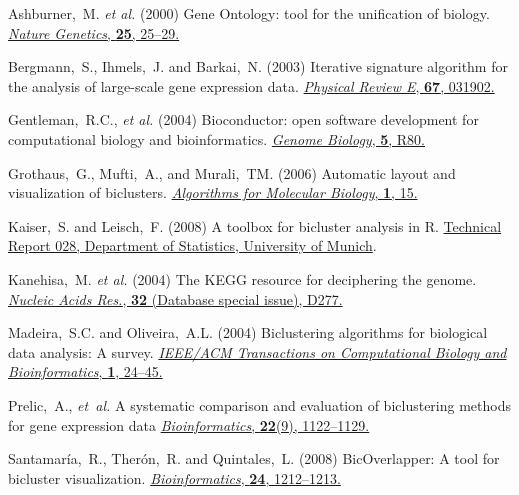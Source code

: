 \documentclass[round]{bioinfo}
\begin{document}
\begin{thebibliography}{6}

Ashburner,~M. \emph{et al.} (2000)
Gene Ontology: tool for the unification of biology.
\href{http://dx.doi.org/10.1038/75556}{\emph{Nature Genetics}, {\bf 25}, 25--29.}

Bergmann,~S., Ihmels,~J. and Barkai,~N. (2003)
Iterative signature algorithm for the analysis of large-scale gene expression data.
\href{http://dx.doi.org/10.1103/PhysRevE.67.031902 }{\emph{Physical Review E}, {\bf 67}, 031902.}


Gentleman,~R.C., \emph{et al.} (2004)
Bioconductor: open software development for computational biology and bioinformatics.
\href{http://dx.doi.org/10.1186/gb-2004-5-10-r80}{\emph{Genome Biology}, {\bf 5}, R80.}

Grothaus,~G., Mufti,~A., and Murali,~TM. (2006)
Automatic layout and visualization of biclusters.
\href{http://dx.doi.org/10.1186/1748-7188-1-15}{\emph{Algorithms for Molecular Biology}, {\bf 1}, 15.}

Kaiser,~S. and Leisch,~F. (2008)
A toolbox for bicluster analysis in R.
\href{http://epub.ub.uni-muenchen.de/3293/}{Technical Report 028, Department of Statistics, University of Munich}.

Kanehisa,~M. \emph{et al.} (2004)
The KEGG resource for deciphering the genome.
\href{http://dx.doi.org/10.1093/nar/gkh063}{\emph{Nucleic Acids Res.}, {\bf 32} (Database special issue), D277.}

Madeira,~S.C. and Oliveira,~A.L. (2004)
Biclustering algorithms for biological data analysis: A survey.
\href{http://dx.doi.org/10.1109/TCBB.2004.2}{\emph{IEEE/ACM Transactions on Computational Biology and Bioinformatics}, {\bf 1}, 24--45.}

Prelic,~A., \emph{et~al.} 
A systematic comparison and evaluation of biclustering methods for gene expression data 
\href{http://dx.doi.org/10.1093/bioinformatics/bt1060}{\emph{Bioinformatics}, {\bf 22}(9), 1122--1129.}

Santamar\'ia,~R., Ther\'on,~R. and Quintales,~L. (2008)
BicOverlapper: A tool for bicluster visualization. 
\href{http://dx.doi.org/10.1093/bioinformatics/btn076}{\emph{Bioinformatics}, {\bf 24}, 1212--1213.}

\end{thebibliography}
\end{document}
